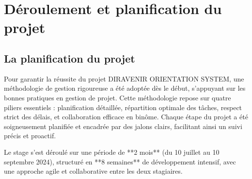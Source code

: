 \documentclass[12pt,a4paper]{report}
\begin{document}
\section{Déroulement et planification du projet}

\subsection{La planification du projet}

Pour garantir la réussite du projet DIRAVENIR ORIENTATION SYSTEM, une méthodologie de gestion rigoureuse a été adoptée dès le début, s'appuyant sur les bonnes pratiques en gestion de projet. Cette méthodologie repose sur quatre piliers essentiels : planification détaillée, répartition optimale des tâches, respect strict des délais, et collaboration efficace en binôme. Chaque étape du projet a été soigneusement planifiée et encadrée par des jalons clairs, facilitant ainsi un suivi précis et proactif.

Le stage s'est déroulé sur une période de **2 mois** (du 10 juillet au 10 septembre 2024), structuré en **8 semaines** de développement intensif, avec une approche agile et collaborative entre les deux stagiaires.
\end{document}
